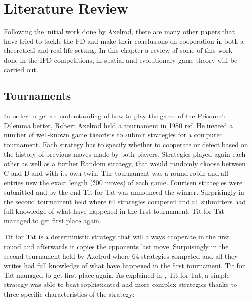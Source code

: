 \chapter{Literature Review}

Following the initial work done by Axelrod, there are many other papers that
have tried to tackle the PD and make their conclusions on cooperation in both a
theoretical and real life setting. In this chapter a review of some of this work
done in the IPD competitions, in spatial and evolutionary game theory will be
carried out.

\section{Tournaments}

In order to get an understanding of how to play the game of the Prisoner's
Dilemma better, Robert Axelrod held a tournament in 1980 ref. He invited a
number of well-known game theorists to submit strategies for a computer
tournament.  Each strategy has to specify whether to cooperate or defect based
on the history of previous moves made by both players.  Strategies played again
each other as well as a further Random strategy, that would randomly choose
between C and D and with its own twin. The tournament was a round robin and all
entries new the exact length (200 moves) of each game.  Fourteen strategies were
submitted and by the end Tit for Tat was announced the winner. Surprisingly in
the second tournament held where 64 strategies competed and all submitters had
full knowledge of what have happened in the first tournament, Tit for Tat
managed to get first place again.\parencite{Axelrod1980a}

Tit for Tat is a deterministic strategy that will always cooperate in the first
round and afterwards it copies the opponents last move. Surprisingly in the
second tournament held by Axelrod \parencite{Axelrod1980a} where 64 strategies
competed and all they writes had full knowledge of what have happened in the
first tournament, Tit for Tat managed to get first place again.
As explained in \parencite{Axelrod1980b}, Tit for Tat, a simple strategy was
able to beat sophisticated and more complex strategies thanks to three
specific characteristics of the strategy:

